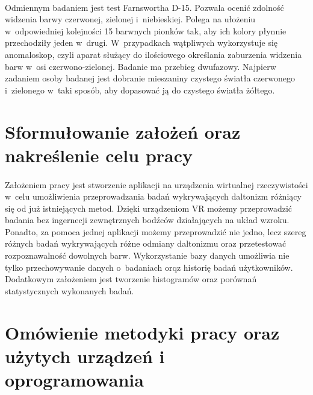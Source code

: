 \documentclass[12pt, letterpaper]{article}
\begin{document}
\newpage	

\paragraph{}
Odmiennym badaniem jest test Farnswortha D-15. Pozwala ocenić zdolność widzenia barwy czerwonej, zielonej i~niebieskiej. Polega na ułożeniu w~odpowiedniej kolejności 15 barwnych pionków tak, aby ich kolory płynnie przechodziły jeden w~drugi. W~przypadkach wątpliwych wykorzystuje się anomaloskop, czyli aparat służący do ilościowego określania zaburzenia widzenia barw w~osi czerwono-zielonej. Badanie ma przebieg dwufazowy. Najpierw zadaniem osoby badanej jest dobranie mieszaniny czystego światła czerwonego i~zielonego w~taki sposób, aby dopasować ją do czystego światła żółtego.

\newpage
\section{Sformułowanie założeń oraz nakreślenie celu pracy}
\paragraph{}
Założeniem pracy jest stworzenie aplikacji na urządzenia wirtualnej rzeczywistości w~celu umożliwienia przeprowadzania badań wykrywających daltonizm różniący się od już istniejących metod. Dzięki urządzeniom VR możemy przeprowadzić badania bez ingernecji zewnętrznych bodźców działających na układ wzroku. Ponadto, za pomoca jednej aplikacji możemy przeprowadzić nie jedno, lecz szereg różnych badań wykrywających różne odmiany daltonizmu oraz przetestować rozpoznawalność dowolnych barw. Wykorzystanie bazy danych umożliwia nie tylko przechowywanie danych o~badaniach orqz historię badań użytkowników. Dodatkowym założeniem jest tworzenie histogramów oraz porównań statystycznych wykonanych badań.

\newpage
\section{Omówienie metodyki pracy oraz użytych urządzeń i oprogramowania}
\end{document}
